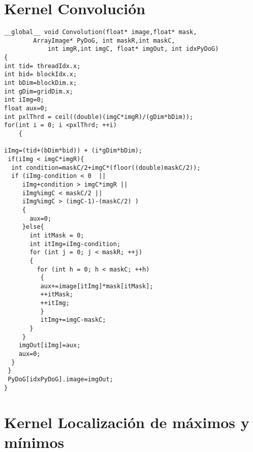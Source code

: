 \chapter{Kernel Convolución}
\begin{small}



\begin{lstlisting}
__global__ void Convolution(float* image,float* mask, 
		ArrayImage* PyDoG, int maskR,int maskC,
	        int imgR,int imgC, float* imgOut, int idxPyDoG)
{
int tid= threadIdx.x;
int bid= blockIdx.x;
int bDim=blockDim.x;
int gDim=gridDim.x;
int iImg=0;
float aux=0;
int pxlThrd = ceil((double)(imgC*imgR)/(gDim*bDim)); 
for(int i = 0; i <pxlThrd; ++i)
	{
		
iImg=(tid+(bDim*bid)) + (i*gDim*bDim); 
 if(iImg < imgC*imgR){
  int condition=maskC/2+imgC*(floor((double)maskC/2));
  if (iImg-condition < 0  ||										
     iImg+condition > imgC*imgR ||								
     iImg%imgC < maskC/2 ||										
     iImg%imgC > (imgC-1)-(maskC/2) )							
     {
       aux=0;
     }else{		
       int itMask = 0;
       int itImg=iImg-condition;
       for (int j = 0; j < maskR; ++j)
       {		
         for (int h = 0; h < maskC; ++h)
          {
       	  aux+=image[itImg]*mask[itMask];
       	  ++itMask;
       	  ++itImg;
          }
          itImg+=imgC-maskC;
       }
     }
	imgOut[iImg]=aux;
	aux=0;
  }
 }
 PyDoG[idxPyDoG].image=imgOut;
}
\end{lstlisting}

\end{small}
\pagebreak

\chapter{Kernel Localización de máximos y mínimos }

